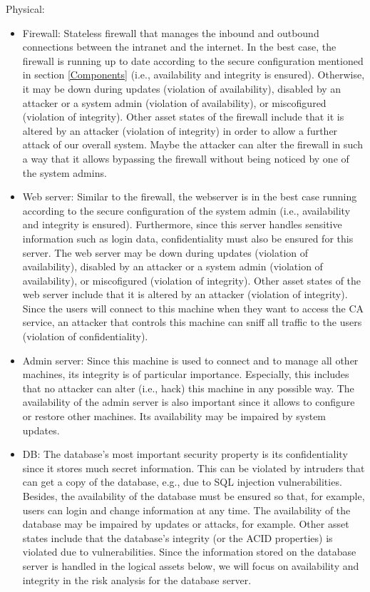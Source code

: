 \documentclass[english]{article}
\begin{document}
  	Physical:
  	\begin{itemize}
      \item Firewall: Stateless firewall that manages the inbound and outbound connections between the intranet and the internet. In the best case, the firewall is running up to date according to the secure configuration mentioned in section \ref{Components} (i.e., availability and integrity is ensured). Otherwise, it may be down during updates (violation of availability), disabled by an attacker or a system admin (violation of availability), or miscofigured (violation of integrity). Other asset states of the firewall include that it is altered by an attacker (violation of integrity) in order to allow a further attack of our overall system. Maybe the attacker can alter the firewall in such a way that it allows bypassing the firewall without being noticed by one of the system admins.
      \item Web server: Similar to the firewall, the webserver is in the best case running according to the secure configuration of the system admin (i.e., availability and integrity is ensured). Furthermore, since this server handles sensitive information such as login data, confidentiality must also be ensured for this server. The web server may be down during updates (violation of availability), disabled by an attacker or a system admin (violation of availability), or miscofigured (violation of integrity). Other asset states of the web server include that it is altered by an attacker (violation of integrity). Since the users will connect to this machine when they want to access the CA service, an attacker that controls this machine can sniff all traffic to the users (violation of confidentiality).
      \item Admin server: Since this machine is used to connect and to manage all other machines, its integrity is of particular importance. Especially, this includes that no attacker can alter (i.e., hack) this machine in any possible way. The availability of the admin server is also important since it allows to configure or restore other machines. Its availability may be impaired by system updates.
      \item DB: The database's most important security property is its confidentiality since it stores much secret information. This can be violated by intruders that can get a copy of the database, e.g., due to SQL injection vulnerabilities. Besides, the availability of the database must be ensured so that, for example, users can login and change information at any time.  The availability of the database may be impaired by updates or attacks, for example. Other asset states include that the database's integrity (or the ACID properties) is violated due to vulnerabilities. Since the information stored on the database server is handled in the logical assets below, we will focus on availability and integrity in the risk analysis for the database server.

\end{itemize}
\end{document}
